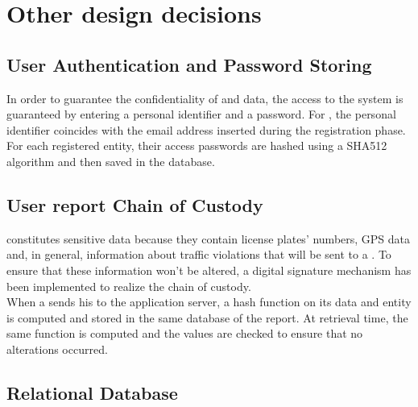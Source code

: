 \documentclass[../../DD.tex]{subfiles}
\begin{document}
\section{Other design decisions\label{sect:2.7}}

\subsection{User Authentication and Password Storing\label{2.7.1}}
In order to guarantee the confidentiality of  and  data, the access to the system is guaranteed by entering a personal identifier and a password. For , the personal identifier coincides with the email address inserted during the registration phase. \\

For each registered entity, their access passwords are hashed using a SHA512 algorithm and then saved in the database.

\subsection{User report Chain of Custody\label{2.7.2}}
 constitutes sensitive data because they contain license plates' numbers, GPS data and, in general, information about traffic violations that will be sent to a . To ensure that these information won't be altered, a digital signature mechanism has been implemented to realize the chain of custody. \\

When a  sends his  to the application server, a hash function on its data and  entity is computed and stored in the same database of the report. At retrieval time, the same function is computed and the values are checked to ensure that no alterations occurred.

\subsection{Relational Database\label{2.7.3}}

\newpage
\end{document}
